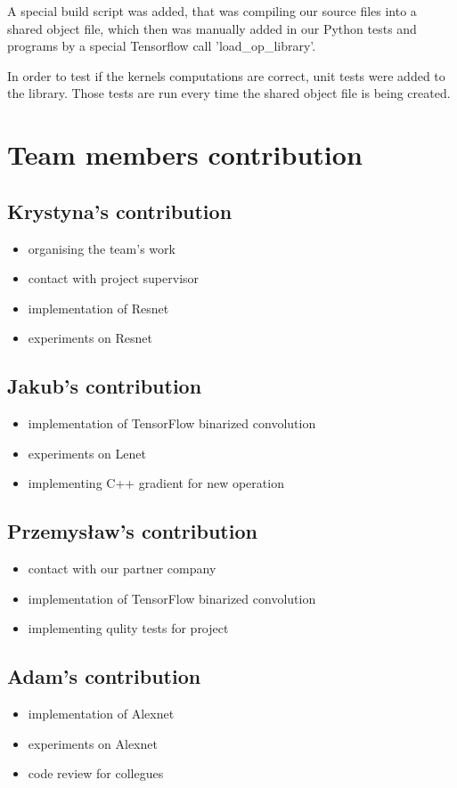 \documentclass[licencjacka]{pracamgr}
\begin{document}
		A special build script was added, that was compiling our source files into a shared object file, which then was manually added in our Python tests and programs by a special Tensorflow call 'load\_op\_library'.

		In order to test if the kernels computations are correct, unit tests were added to the library. Those tests are run every time the shared object file is being created.
	
	\chapter{Team members contribution}
	\section{Krystyna's contribution}
		\begin{itemize}
			\item organising the team's work
			\item contact with project supervisor
			\item implementation of Resnet
			\item experiments on Resnet
		\end{itemize}
	\section{Jakub's contribution}
		\begin{itemize}
			\item implementation of TensorFlow binarized convolution
			\item experiments on Lenet
			\item implementing C++ gradient for new operation
		\end{itemize}
	\section{Przemysław's contribution}
		\begin{itemize}
			\item contact with our partner company
			\item implementation of TensorFlow binarized convolution
			\item implementing qulity tests for project
		\end{itemize}
	\section{Adam's contribution}
		\begin{itemize}
			\item implementation of Alexnet
			\item experiments on Alexnet
			\item code review for collegues
		\end{itemize}
\end{document}
